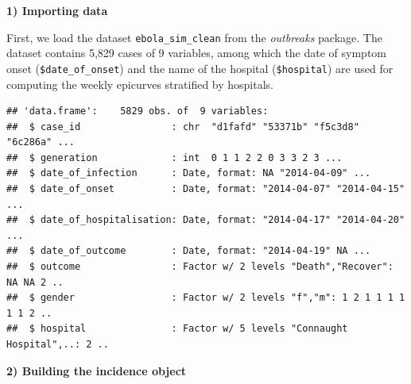 \documentclass[9pt,a4paper]{extarticle}
\newenvironment{Shaded}{\begin{snugshade}}{\end{snugshade}}
\newcommand{\DataTypeTok}[1]{\textcolor[rgb]{0.13,0.29,0.53}{#1}}
\newcommand{\DecValTok}[1]{\textcolor[rgb]{0.00,0.00,0.81}{#1}}
\newcommand{\KeywordTok}[1]{\textcolor[rgb]{0.13,0.29,0.53}{\textbf{#1}}}
\newcommand{\NormalTok}[1]{#1}
\newcommand{\OperatorTok}[1]{\textcolor[rgb]{0.81,0.36,0.00}{\textbf{#1}}}
\newcommand{\StringTok}[1]{\textcolor[rgb]{0.31,0.60,0.02}{#1}}
\begin{document}
\textbf{1)  Importing data}

First, we load the dataset \texttt{ebola\_sim\_clean} from the \textit{outbreaks} package.
The dataset contains 5,829 cases of 9 variables, among which the date of symptom onset (\texttt{\$date\_of\_onset}) and the name of the hospital (\texttt{\$hospital}) are used for computing the weekly epicurves stratified by hospitals.

\begin{Shaded}
\end{Shaded}

\begin{verbatim}
## 'data.frame':    5829 obs. of  9 variables:
##  $ case_id                : chr  "d1fafd" "53371b" "f5c3d8" "6c286a" ...
##  $ generation             : int  0 1 1 2 2 0 3 3 2 3 ...
##  $ date_of_infection      : Date, format: NA "2014-04-09" ...
##  $ date_of_onset          : Date, format: "2014-04-07" "2014-04-15" ...
##  $ date_of_hospitalisation: Date, format: "2014-04-17" "2014-04-20" ...
##  $ date_of_outcome        : Date, format: "2014-04-19" NA ...
##  $ outcome                : Factor w/ 2 levels "Death","Recover": NA NA 2 ..
##  $ gender                 : Factor w/ 2 levels "f","m": 1 2 1 1 1 1 1 1 2 ..
##  $ hospital               : Factor w/ 5 levels "Connaught Hospital",..: 2 ..
\end{verbatim}


\textbf{2) Building the incidence object}
\end{document}
